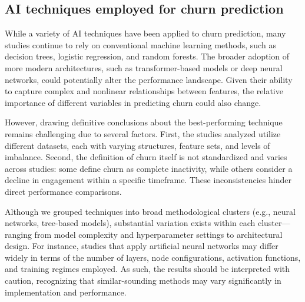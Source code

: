 \subsection{AI techniques employed for churn prediction}

\noindent While a variety of AI techniques have been applied to churn prediction, many studies continue to rely on conventional machine learning methods, such as decision trees, logistic regression, and random forests. 
The broader adoption of more modern architectures, such as transformer-based models or deep neural networks, could potentially alter the performance landscape. Given their ability to capture complex and nonlinear relationships between features, the relative importance of different variables in predicting churn could also change.

However, drawing definitive conclusions about the best-performing technique remains challenging due to several factors. First, the studies analyzed utilize different datasets, each with varying structures, feature sets, and levels of imbalance. Second, the definition of churn itself is not standardized and varies across studies: some define churn as complete inactivity, while others consider a decline in engagement within a specific timeframe. These inconsistencies hinder direct performance comparisons.

Although we grouped techniques into broad methodological clusters (e.g., neural networks, tree-based models), substantial variation exists within each cluster—ranging from model complexity and hyperparameter settings to architectural design. 
For instance, studies that apply artificial neural networks may differ widely in terms of the number of layers, node configurations, activation functions, and training regimes employed. As such, the results should be interpreted with caution, recognizing that similar-sounding methods may vary significantly in implementation and performance.


